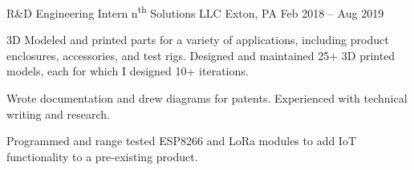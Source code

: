 \documentclass[]{awesome-cv}
\begin{document}
\begin{cventries}
	\cventry
	{R\&D Engineering Intern}
	{n\textsuperscript{th} Solutions LLC}
	{Exton, PA}
	{Feb 2018 – Aug 2019}
	{\begin{cvitems}
		\item {3D Modeled and printed parts for a variety of applications, including product enclosures, accessories, and test rigs. Designed and maintained 25+ 3D printed models, each for which I designed 10+ iterations.}
		\item {Wrote documentation and drew diagrams for patents. Experienced with technical writing and research.}
		\item {Programmed and range tested ESP8266 and LoRa modules to add IoT functionality to a pre-existing product.}
		\end{cvitems}}
\end{cventries}
\vspace{-15pt}
\end{document}
